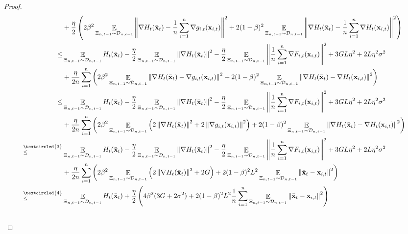 \documentclass{article}
\begin{document}
\begin{proof}
\begin{align}
& + \frac{\eta}{2}\lrincir{2\beta^2\EE_{ \Xi_{n,t-1} \sim \Dcal_{n,t-1} }\lrnorm{\nabla H_t(\bar{\x}_t) -\frac{1}{n}\sum_{i=1}^n \nabla g_{i,t}(\x_{i,t})}^2 + 2(1-\beta)^2\EE_{ \Xi_{n,t-1} \sim \Dcal_{n,t-1} }\lrnorm{\nabla H_t(\bar{\x}_t) -\frac{1}{n}\sum_{i=1}^n \nabla H_t(\x_{i,t})}^2  }  \\ \nonumber
\le & \EE_{ \Xi_{n,t-1} \sim \Dcal_{n,t-1} } H_t(\bar{\x}_t) - \frac{\eta}{2}\EE_{ \Xi_{n,t-1} \sim \Dcal_{n,t-1} }\lrnorm{\nabla H_t(\bar{\x}_t)}^2 - \frac{\eta}{2}\EE_{ \Xi_{n,t-1} \sim \Dcal_{n,t-1} }\lrnorm{\frac{1}{n}\sum_{i=1}^n \nabla F_{i,t}(\x_{i,t})}^2  + 3GL\eta^2  + 2L\eta^2 \sigma^2 \\ \nonumber
& + \frac{\eta}{2n}\sum_{i=1}^n\lrincir{2\beta^2\EE_{ \Xi_{n,t-1} \sim \Dcal_{n,t-1} }\lrnorm{\nabla H_t(\bar{\x}_t) - \nabla g_{i,t}(\x_{i,t})}^2 + 2(1-\beta)^2\EE_{ \Xi_{n,t-1} \sim \Dcal_{n,t-1} }\lrnorm{\nabla H_t(\bar{\x}_t) - \nabla H_t(\x_{i,t})}^2  }  \\ \nonumber
\le & \EE_{ \Xi_{n,t-1} \sim \Dcal_{n,t-1} } H_t(\bar{\x}_t) - \frac{\eta}{2}\EE_{ \Xi_{n,t-1} \sim \Dcal_{n,t-1} }\lrnorm{\nabla H_t(\bar{\x}_t)}^2 - \frac{\eta}{2}\EE_{ \Xi_{n,t-1} \sim \Dcal_{n,t-1} }\lrnorm{\frac{1}{n}\sum_{i=1}^n \nabla F_{i,t}(\x_{i,t})}^2  + 3GL\eta^2  + 2L\eta^2 \sigma^2 \\ \nonumber
& + \frac{\eta}{2n}\sum_{i=1}^n\lrincir{2\beta^2\EE_{ \Xi_{n,t-1} \sim \Dcal_{n,t-1} }\lrincir{2\lrnorm{\nabla H_t(\bar{\x}_t) }^2 + 2\lrnorm{\nabla g_{i,t}(\x_{i,t})}^2} + 2(1-\beta)^2\EE_{ \Xi_{n,t-1} \sim \Dcal_{n,t-1} }\lrnorm{\nabla H_t(\bar{\x}_t) - \nabla H_t(\x_{i,t})}^2  }  \\ \nonumber
\refabovecir{\le}{\textcircled{3}} & \EE_{ \Xi_{n,t-1} \sim \Dcal_{n,t-1} } H_t(\bar{\x}_t) - \frac{\eta}{2}\EE_{ \Xi_{n,t-1} \sim \Dcal_{n,t-1} }\lrnorm{\nabla H_t(\bar{\x}_t)}^2 - \frac{\eta}{2}\EE_{ \Xi_{n,t-1} \sim \Dcal_{n,t-1} }\lrnorm{\frac{1}{n}\sum_{i=1}^n \nabla F_{i,t}(\x_{i,t})}^2  + 3GL\eta^2  + 2L\eta^2 \sigma^2 \\ \nonumber
& + \frac{\eta}{2n}\sum_{i=1}^n\lrincir{2\beta^2\EE_{ \Xi_{n,t-1} \sim \Dcal_{n,t-1} }\lrincir{2\lrnorm{\nabla H_t(\bar{\x}_t) }^2 + 2G} + 2(1-\beta)^2 L^2\EE_{ \Xi_{n,t-1} \sim \Dcal_{n,t-1} }\lrnorm{ \bar{\x}_t - \x_{i,t} }^2  }  \\ \nonumber
\refabovecir{\le}{\textcircled{4}} & \EE_{ \Xi_{n,t-1} \sim \Dcal_{n,t-1} }H_t(\bar{\x}_t) + \frac{\eta}{2}\lrincir{4\beta^2 (3G + 2\sigma^2) + 2(1-\beta)^2 L^2\frac{1}{n}\sum_{i=1}^n \EE_{ \Xi_{n,t-1} \sim \Dcal_{n,t-1} }\lrnorm{\bar{\x}_t -\x_{i,t}}^2  }  \\ \nonumber 

\end{align}
\end{proof}
\end{document}

